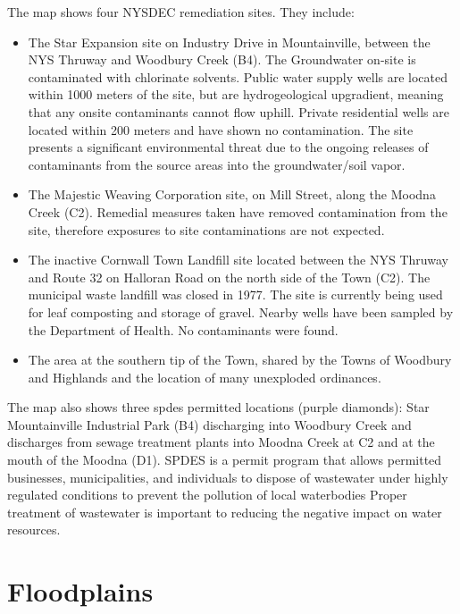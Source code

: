 The map shows four NYSDEC remediation sites. They include:
\begin{itemize}
    \item The Star Expansion site on Industry Drive in Mountainville, between 
    the NYS Thruway and Woodbury Creek (B4). The Groundwater on-site is 
    contaminated with chlorinate solvents. Public water supply wells are 
    located within 1000 meters of the site, but are hydrogeological 
    upgradient, meaning that any onsite contaminants cannot flow 
    uphill. Private residential wells are located within 200 meters 
    and have shown no contamination. The site presents a significant 
    environmental threat due to the ongoing releases of contaminants from the 
    source areas into the groundwater/soil vapor.
    \item The Majestic Weaving Corporation site, on Mill Street, along the 
    Moodna Creek (C2). Remedial measures taken have removed contamination from 
    the site, therefore exposures to site contaminations are not expected.
    \item The inactive Cornwall Town Landfill site located between the NYS 
    Thruway and Route 32 on Halloran Road on the north side of the Town (C2). 
    The municipal waste landfill was closed in 1977. The site is currently 
    being used for leaf composting and storage of gravel. Nearby wells have 
    been sampled by the Department of Health. No contaminants were found.
    \item The area at the southern tip of the Town, shared by the Towns of 
    Woodbury and Highlands and the location of many unexploded ordinances.
\end{itemize}
The map also shows three \gls{spdes} permitted 
locations (purple diamonds): Star Mountainville Industrial Park (B4) 
discharging into Woodbury Creek and discharges from sewage treatment plants into 
Moodna Creek at C2 and at the mouth of the Moodna (D1). SPDES is a permit 
program that allows permitted businesses, municipalities, and individuals to 
dispose of wastewater under highly regulated conditions to prevent the pollution 
of local waterbodies Proper treatment of wastewater is important to reducing the 
negative impact on water resources.

\chapter{Floodplains}\label{subsec:floodzones}
